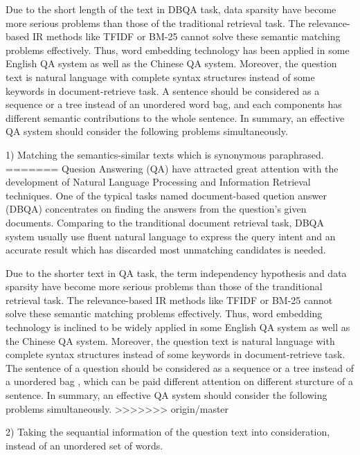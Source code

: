 \documentclass{llncs}
\begin{document}
Due to the short length of the text in DBQA task, data sparsity  have become more serious problems than those of the traditional retrieval task. The relevance-based IR methods like TFIDF or BM-25 cannot solve these semantic matching problems effectively. Thus, word embedding technology \cite{Mikolov2013Efficient} has been applied in some English QA system as well as the Chinese QA system. Moreover, the question text is natural language with complete syntax structures instead of some keywords in document-retrieve task. A sentence should be considered as a sequence or a tree instead of an unordered word bag, and each components has different semantic contributions to the whole sentence. In summary, an effective QA system should consider the following problems simultaneously.

1) Matching the semantics-similar texts which is synonymous paraphrased.  
=======
Quesion Answering (QA) have attracted great  attention with the development of Natural Language Processing and Information Retrieval techniques. One of the typical tasks named document-based quetion answer (DBQA) concentrates on finding the answers from the question's given documents.
Comparing to the tranditional document retrieval task, DBQA system usually use fluent natural language to express the query intent and an accurate result which has discarded most unmatching candidates is needed. 

Due to the shorter text in QA task, the term independency hypothesis and data sparsity  have become more serious problems than those of the tranditional retrieval task. The relevance-based IR methods like TFIDF or BM-25 cannot solve these semantic matching problems effectively. Thus, word embedding technology \cite{Mikolov2013Efficient} is inclined to  be widely applied in some English QA system as well as the Chinese QA system. Moreover, the question text is natural language with complete syntax structures instead of some keywords in document-retrieve task. The sentence of a question should be considered as a sequence or a tree instead of a unordered bag , which can be paid different attention on different sturcture of a sentence. In summary, an effective QA system should consider the following problems simultaneously.
>>>>>>> origin/master

2) Taking the sequantial information of the question text into consideration, instead of an unordered set of words.
\end{document}

